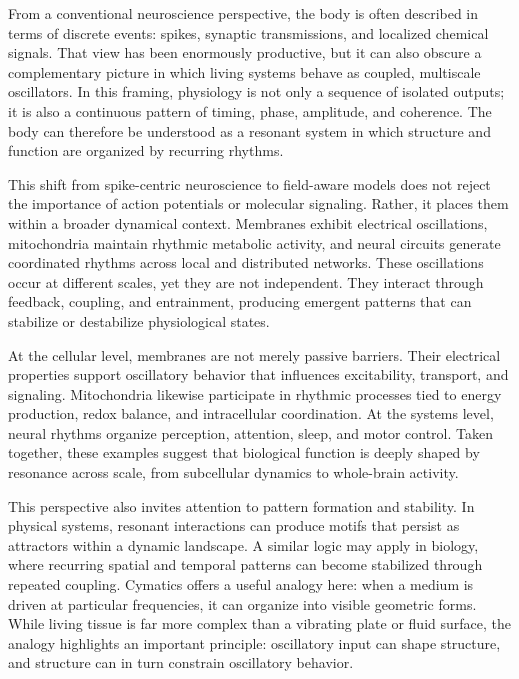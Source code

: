 From a conventional neuroscience perspective, the body is often described in terms of discrete events: spikes, synaptic transmissions, and localized chemical signals. That view has been enormously productive, but it can also obscure a complementary picture in which living systems behave as coupled, multiscale oscillators. In this framing, physiology is not only a sequence of isolated outputs; it is also a continuous pattern of timing, phase, amplitude, and coherence. The body can therefore be understood as a resonant system in which structure and function are organized by recurring rhythms.

This shift from spike-centric neuroscience to field-aware models does not reject the importance of action potentials or molecular signaling. Rather, it places them within a broader dynamical context. Membranes exhibit electrical oscillations, mitochondria maintain rhythmic metabolic activity, and neural circuits generate coordinated rhythms across local and distributed networks. These oscillations occur at different scales, yet they are not independent. They interact through feedback, coupling, and entrainment, producing emergent patterns that can stabilize or destabilize physiological states.

At the cellular level, membranes are not merely passive barriers. Their electrical properties support oscillatory behavior that influences excitability, transport, and signaling. Mitochondria likewise participate in rhythmic processes tied to energy production, redox balance, and intracellular coordination. At the systems level, neural rhythms organize perception, attention, sleep, and motor control. Taken together, these examples suggest that biological function is deeply shaped by resonance across scale, from subcellular dynamics to whole-brain activity.

This perspective also invites attention to pattern formation and stability. In physical systems, resonant interactions can produce motifs that persist as attractors within a dynamic landscape. A similar logic may apply in biology, where recurring spatial and temporal patterns can become stabilized through repeated coupling. Cymatics offers a useful analogy here: when a medium is driven at particular frequencies, it can organize into visible geometric forms. While living tissue is far more complex than a vibrating plate or fluid surface, the analogy highlights an important principle: oscillatory input can shape structure, and structure can in turn constrain oscillatory behavior.

